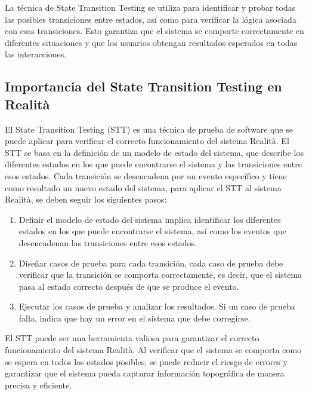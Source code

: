 \documentclass[12pt,a4paper, twoside]{article} %
\begin{document}
La técnica de State Transition Testing se utiliza para identificar y probar todas las posibles transiciones entre estados, así como para verificar la lógica asociada con esas transiciones. Esto garantiza que el sistema se comporte correctamente en diferentes situaciones y que los usuarios obtengan resultados esperados en todas las interacciones.

\subsection{Importancia del State Transition Testing en Realità}
\label{sec:orgdaca22c}

El State Transition Testing (STT) es una técnica de prueba de software que se puede aplicar para verificar el correcto funcionamiento del sistema Realità. El STT se basa en la definición de un modelo de estado del sistema, que describe los diferentes estados en los que puede encontrarse el sistema y las transiciones entre esos estados. Cada transición se desencadena por un evento específico y tiene como resultado un nuevo estado del sistema, para aplicar el STT al sistema Realità, se deben seguir los siguientes pasos:

\begin{enumerate}
\item Definir el modelo de estado del sistema implica identificar los diferentes estados en los que puede encontrarse el sistema, así como los eventos que desencadenan las transiciones entre esos estados.

\item Diseñar casos de prueba para cada transición, cada caso de prueba debe verificar que la transición se comporta correctamente, es decir, que el sistema pasa al estado correcto después de que se produce el evento.

\item Ejecutar los casos de prueba y analizar los resultados. Si un caso de prueba falla, indica que hay un error en el sistema que debe corregirse.


\end{enumerate}



El STT puede ser una herramienta valiosa para garantizar el correcto funcionamiento del sistema Realità. Al verificar que el sistema se comporta como se espera en todos los estados posibles, se puede reducir el riesgo de errores y garantizar que el sistema pueda capturar información topográfica de manera precisa y eficiente.
\end{document}
